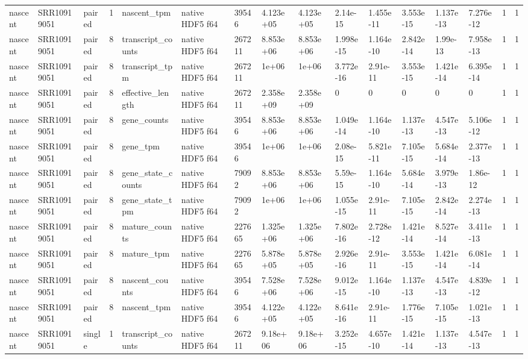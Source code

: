 \begin{tabular}{llllllllllllllll}
nascent & SRR10919051 & paired & 1 & nascent\_tpm & native HDF5 f64 & 39546 & 4.123e+05 & 4.123e+05 & 2.14e-15 & 1.455e-11 & 3.553e-15 & 1.137e-13 & 7.276e-12 & 1 & 1 \\
nascent & SRR10919051 & paired & 8 & transcript\_counts & native HDF5 f64 & 267211 & 8.853e+06 & 8.853e+06 & 1.998e-15 & 1.164e-10 & 2.842e-14 & 1.99e-13 & 7.958e-13 & 1 & 1 \\
nascent & SRR10919051 & paired & 8 & transcript\_tpm & native HDF5 f64 & 267211 & 1e+06 & 1e+06 & 3.772e-16 & 2.91e-11 & 3.553e-15 & 1.421e-14 & 6.395e-14 & 1 & 1 \\
nascent & SRR10919051 & paired & 8 & effective\_length & native HDF5 f64 & 267211 & 2.358e+09 & 2.358e+09 & 0 & 0 & 0 & 0 & 0 & 1 & 1 \\
nascent & SRR10919051 & paired & 8 & gene\_counts & native HDF5 f64 & 39546 & 8.853e+06 & 8.853e+06 & 1.049e-14 & 1.164e-10 & 1.137e-13 & 4.547e-13 & 5.106e-12 & 1 & 1 \\
nascent & SRR10919051 & paired & 8 & gene\_tpm & native HDF5 f64 & 39546 & 1e+06 & 1e+06 & 2.08e-15 & 5.821e-11 & 7.105e-15 & 5.684e-14 & 2.377e-13 & 1 & 1 \\
nascent & SRR10919051 & paired & 8 & gene\_state\_counts & native HDF5 f64 & 79092 & 8.853e+06 & 8.853e+06 & 5.59e-15 & 1.164e-10 & 5.684e-14 & 3.979e-13 & 1.86e-12 & 1 & 1 \\
nascent & SRR10919051 & paired & 8 & gene\_state\_tpm & native HDF5 f64 & 79092 & 1e+06 & 1e+06 & 1.055e-15 & 2.91e-11 & 7.105e-15 & 2.842e-14 & 2.274e-13 & 1 & 1 \\
nascent & SRR10919051 & paired & 8 & mature\_counts & native HDF5 f64 & 227665 & 1.325e+06 & 1.325e+06 & 7.802e-16 & 2.728e-12 & 1.421e-14 & 8.527e-14 & 3.411e-13 & 1 & 1 \\
nascent & SRR10919051 & paired & 8 & mature\_tpm & native HDF5 f64 & 227665 & 5.878e+05 & 5.878e+05 & 2.926e-16 & 2.91e-11 & 3.553e-15 & 1.421e-14 & 6.081e-14 & 1 & 1 \\
nascent & SRR10919051 & paired & 8 & nascent\_counts & native HDF5 f64 & 39546 & 7.528e+06 & 7.528e+06 & 9.012e-15 & 1.164e-10 & 1.137e-13 & 4.547e-13 & 4.839e-12 & 1 & 1 \\
nascent & SRR10919051 & paired & 8 & nascent\_tpm & native HDF5 f64 & 39546 & 4.122e+05 & 4.122e+05 & 8.641e-16 & 2.91e-11 & 1.776e-15 & 7.105e-15 & 1.021e-13 & 1 & 1 \\
nascent & SRR10919051 & single & 1 & transcript\_counts & native HDF5 f64 & 267211 & 9.18e+06 & 9.18e+06 & 3.252e-15 & 4.657e-10 & 1.421e-14 & 1.137e-13 & 4.547e-13 & 1 & 1 \\

\end{tabular}
